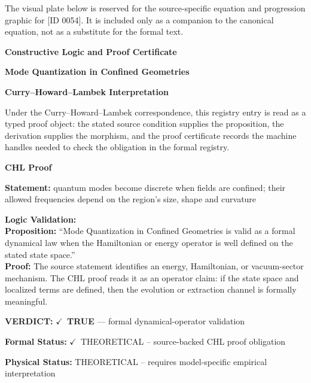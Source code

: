 \begingroup\footnotesize\sloppy
The visual plate below is reserved for the source-specific equation and progression graphic for [ID 0054]. It is included only as a companion to the canonical equation, not as a substitute for the formal text.
\par\endgroup
\ifTZPDarkEdition
{}
\fi

\clearpage
\begingroup\tzpsupportsetup
\noindent\textbf{\fontsize{10.8pt}{12.8pt}\selectfont [ID 0054] Constructive Logic and Proof Certificate}\par
\noindent\textbf{\fontsize{10pt}{12pt}\selectfont Mode Quantization in Confined Geometries}\par
\vspace{0.45em}
\begingroup
\footnotesize
\setlength{\parskip}{0.22em}
\setlength{\parindent}{0pt}
\noindent\textbf{Curry--Howard--Lambek Interpretation}\par
Under the Curry--Howard--Lambek correspondence, this registry entry is read as a typed proof
object: the stated source condition supplies the proposition, the derivation supplies the
morphism, and the proof certificate records the machine handles needed to check the obligation
in the formal registry.

\vspace{0.45em}
\noindent\textbf{CHL Proof}\par
\textbf{Statement:} quantum modes become discrete when fields are confined; their allowed frequencies depend
on the region's size, shape and curvature

\textbf{Logic Validation:}\\
\textbf{Proposition:} ``Mode Quantization in Confined Geometries is valid as a formal dynamical law when the
Hamiltonian or energy operator is well defined on the stated state space.''\\
\textbf{Proof:} The source statement identifies an energy, Hamiltonian, or vacuum-sector mechanism. The
CHL proof reads it as an operator claim: if the state space and localized terms are
defined, then the evolution or extraction channel is formally meaningful.

\textbf{VERDICT:} \ensuremath{\checkmark}\ \textbf{TRUE} --- formal dynamical-operator validation

\textbf{Formal Status:} \ensuremath{\checkmark}\ THEORETICAL -- source-backed CHL proof obligation

\textbf{Physical Status:} THEORETICAL -- requires model-specific empirical interpretation
\par\vspace{0.45em}
\par
\ifTZPDarkEdition
{}
\fi
\endgroup
\endgroup

